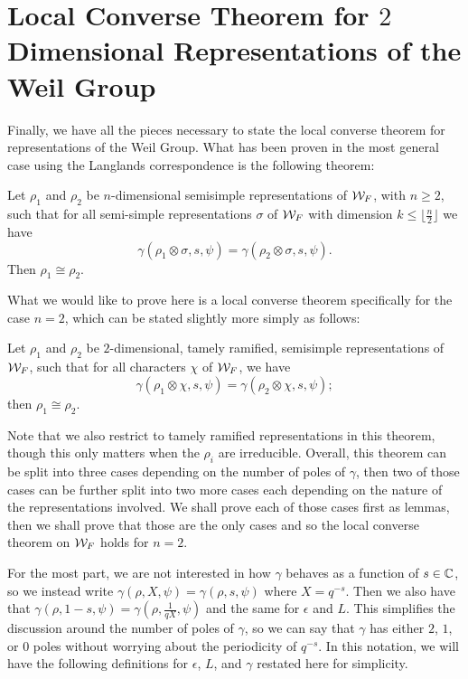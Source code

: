 \section{Local Converse Theorem for $2$ Dimensional Representations of the Weil Group}
\label{sec:n=2-LCT-weil-group}
Finally, we have all the pieces necessary to state the local converse theorem for representations of the Weil Group.
What has been proven in the most general case using the Langlands correspondence is the following theorem:

\begin{theorem}
  Let $\rho_1$ and $\rho_2$ be $n$-dimensional semisimple representations of $\cW_F$, with $n \geq 2$, such that for all semi-simple representations $\sigma$ of $\cW_F$ with dimension $k \leq \lfloor \frac{n}{2} \rfloor$ we have
  \[\gamma(\rho_1 \otimes \sigma,s,\psi) = \gamma(\rho_2 \otimes \sigma,s,\psi).\]
  Then $\rho_1 \cong \rho_2$.
\end{theorem}


What we would like to prove here is a local converse theorem specifically for the case $n=2$, which can be stated slightly more simply as follows:

\begin{theorem}[Local Converse Theorem on $\cW_F$ with $n=2$]
  \label{thm:LCTn=2}
  Let $\rho_1$ and $\rho_2$ be $2$-dimensional, tamely ramified, semisimple representations of $\cW_F$, such that for all characters $\chi$ of $\cW_F$, we have
  \[\gamma(\rho_1 \otimes \chi,s,\psi) = \gamma(\rho_2 \otimes \chi,s,\psi);\]
  then $\rho_1 \cong \rho_2$.
\end{theorem}

Note that we also restrict to tamely ramified representations in this theorem, though this only matters when the $\rho_i$ are irreducible.
Overall, this theorem can be split into three cases depending on the number of poles of $\gamma$, then two of those cases can be further split into two more cases each depending on the nature of the representations involved.
We shall prove each of those cases first as lemmas, then we shall prove that those are the only cases and so the local converse theorem on $\cW_F$ holds for $n=2$.

For the most part, we are not interested in how $\gamma$ behaves as a function of $s \in \mathbb{C}$, so we instead write $\gamma(\rho, X, \psi) = \gamma(\rho,s,\psi)$ where $X = q^{-s}$.
Then we also have that $\gamma(\rho,1-s,\psi) = \gamma(\rho,\frac{1}{qX},\psi)$ and the same for $\epsilon$ and $L$.
This simplifies the discussion around the number of poles of $\gamma$, so we can say that $\gamma$ has either $2$, $1$, or $0$ poles without worrying about the periodicity of $q^{-s}$.
In this notation, we will have the following definitions for $\epsilon$, $L$, and $\gamma$ restated here for simplicity.

